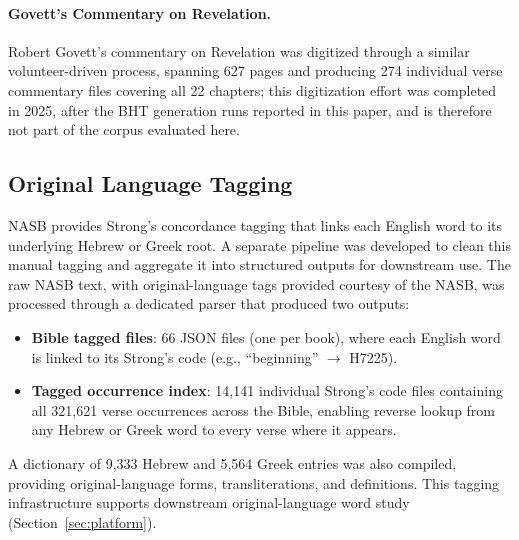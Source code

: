 \paragraph{Govett's Commentary on Revelation.} Robert Govett's commentary on Revelation was digitized through a similar volunteer-driven process, spanning 627 pages and producing 274 individual verse commentary files covering all 22 chapters; this digitization effort was completed in 2025, after the BHT generation runs reported in this paper, and is therefore not part of the corpus evaluated here.

\subsection{Original Language Tagging}

NASB provides Strong's concordance tagging that links each English word to its underlying Hebrew or Greek root. A separate pipeline was developed to clean this manual tagging and aggregate it into structured outputs for downstream use. The raw NASB text, with original-language tags provided courtesy of the NASB, was processed through a dedicated parser that produced two outputs:

\begin{itemize}[nosep,leftmargin=*]
    \item \textbf{Bible tagged files}: 66 JSON files (one per book), where each English word is linked to its Strong's code (e.g., ``beginning'' $\rightarrow$ H7225).
    \item \textbf{Tagged occurrence index}: 14{,}141 individual Strong's code files containing all 321{,}621 verse occurrences across the Bible, enabling reverse lookup from any Hebrew or Greek word to every verse where it appears.
\end{itemize}

\noindent A dictionary of 9{,}333 Hebrew and 5{,}564 Greek entries was also compiled, providing original-language forms, transliterations, and definitions. This tagging infrastructure supports downstream original-language word study (Section~\ref{sec:platform}).
